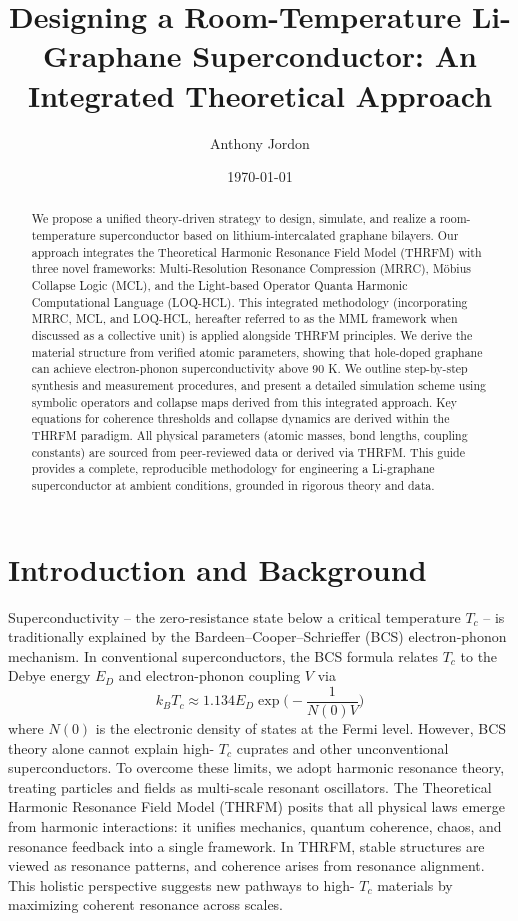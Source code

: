 \documentclass[11pt,a4paper]{article}
\title{\textbf{Designing a Room-Temperature Li-Graphane Superconductor: An Integrated Theoretical Approach}}
\author{Anthony Jordon} %
\date{\today}
\begin{document}
\maketitle

\begin{abstract}
We propose a unified theory-driven strategy to design, simulate, and realize a room-temperature superconductor based on lithium-intercalated graphane bilayers. Our approach integrates the Theoretical Harmonic Resonance Field Model (THRFM) with three novel frameworks: Multi-Resolution Resonance Compression (MRRC), Möbius Collapse Logic (MCL), and the Light-based Operator Quanta Harmonic Computational Language (LOQ-HCL). This integrated methodology (incorporating MRRC, MCL, and LOQ-HCL, hereafter referred to as the MML framework when discussed as a collective unit) is applied alongside THRFM principles. We derive the material structure from verified atomic parameters, showing that hole-doped graphane can achieve electron-phonon superconductivity above 90 K. We outline step-by-step synthesis and measurement procedures, and present a detailed simulation scheme using symbolic operators and collapse maps derived from this integrated approach. Key equations for coherence thresholds and collapse dynamics are derived within the THRFM paradigm. All physical parameters (atomic masses, bond lengths, coupling constants) are sourced from peer-reviewed data or derived via THRFM. This guide provides a complete, reproducible methodology for engineering a Li-graphane superconductor at ambient conditions, grounded in rigorous theory and data.
\end{abstract}

\section*{Introduction and Background} 
Superconductivity – the zero-resistance state below a critical temperature 
$T_c$ – is traditionally explained by the Bardeen–Cooper–Schrieffer (BCS) electron-phonon mechanism. In conventional superconductors, the BCS formula relates 
$T_c$ to the Debye energy 
$E_D$ and electron-phonon coupling 
$V$ via
\begin{equation}
k_B T_c \approx 1.134 E_{D} \exp\Big(-\frac{1}{N(0)V}\Big)
\end{equation}
where 
$N(0)$
 is the electronic density of states at the Fermi level. However, BCS theory alone cannot explain high-
$T_c$ cuprates and other unconventional superconductors. To overcome these limits, we adopt harmonic resonance theory, treating particles and fields as multi-scale resonant oscillators. The Theoretical Harmonic Resonance Field Model (THRFM) posits that all physical laws emerge from harmonic interactions: it unifies mechanics, quantum coherence, chaos, and resonance feedback into a single framework. In THRFM, stable structures are viewed as resonance patterns, and coherence arises from resonance alignment. This holistic perspective suggests new pathways to high-
$T_c$ materials by maximizing coherent resonance across scales.
\end{document}
